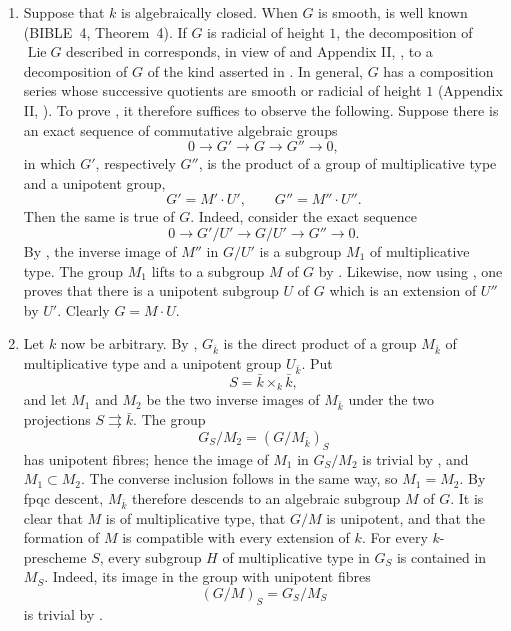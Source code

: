 \begin{enumerate}
\item[(i)] Suppose that \(k\) is algebraically closed.  When \(G\)
  is smooth,  is well known (BIBLE~4, Theorem~4).  If
  \(G\) is radicial of height \(1\), the decomposition of
  \(\operatorname{Lie}G\) described in  corresponds, in view
  of  and Appendix II, , to a decomposition of \(G\) of
  the kind asserted in .  In general, \(G\) has a
  composition series whose successive quotients are smooth or
  radicial of height \(1\) (Appendix II, ).  To prove ,
  it therefore suffices to observe the following.  Suppose there
  is an exact sequence of commutative algebraic groups
  \[
    0\longrightarrow G'\longrightarrow G\longrightarrow
    G''\longrightarrow0,
  \]
  in which \(G'\), respectively \(G''\), is the product of a group
  of multiplicative type and a unipotent group,
  \[
    G'=M'\cdot U',\qquad G''=M''\cdot U''.
  \]
  Then the same is true of \(G\).  Indeed, consider the exact
  sequence
  \[
    0\longrightarrow G'/U'\longrightarrow G/U'
      \longrightarrow G''\longrightarrow0.
  \]
  By , the inverse image of \(M''\) in \(G/U'\) is a
  subgroup \(M_1\) of multiplicative type.  The group \(M_1\)
  lifts to a subgroup \(M\) of \(G\) by .  Likewise,
  now using , one proves that there is a unipotent
  subgroup \(U\) of \(G\) which is an extension of \(U''\) by
  \(U'\).  Clearly \(G=M\cdot U\).

\item[(ii)] Let \(k\) now be arbitrary.  By ,
  \(G_{\bar k}\) is the direct product of a group
  \(M_{\bar k}\) of multiplicative type and a unipotent group
  \(U_{\bar k}\).  Put
  \[
    S=\bar k\times_k\bar k,
  \]
  and let \(M_1\) and \(M_2\) be the two inverse images of
  \(M_{\bar k}\) under the two projections
  \(S\rightrightarrows\bar k\).  The group
  \[
    G_S/M_2=(G/M_{\bar k})_S
  \]
  has unipotent fibres; hence the image of \(M_1\) in \(G_S/M_2\)
  is trivial by , and \(M_1\subset M_2\).  The converse
  inclusion follows in the same way, so \(M_1=M_2\).  By fpqc
  descent, \(M_{\bar k}\) therefore descends to an algebraic
  subgroup \(M\) of \(G\).  It is clear that \(M\) is of
  multiplicative type, that \(G/M\) is unipotent, and that the
  formation of \(M\) is compatible with every extension of
  \(k\).  For every \(k\)-prescheme \(S\), every subgroup \(H\) of
  multiplicative type in \(G_S\) is contained in \(M_S\).
  Indeed, its image in the group with unipotent fibres
  \[
    (G/M)_S=G_S/M_S
  \]
  is trivial by .


\end{enumerate}
